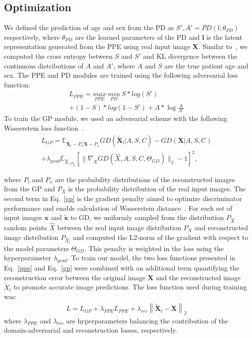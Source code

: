 \documentclass[conference]{IEEEtran}
\begin{document}
\subsection{Optimization}
We defined the prediction of age and sex from the PD as $S',A'=PD(l;\theta_{PD})$ respectively, where $\theta_{PD}$ are the learned parameters of the PD and \textbf{l} is the latent representation generated from the PPE using real input image \textbf{X}. Similar to~\cite{Wang2021Deep}, we computed the cross entropy between $S$ and $S'$ and KL divergence between the continuous distributions of $A$ and $A'$, where $A$ and $S$ are the true patient age and sex. The PPE and PD modules are trained using the following adversarial loss function:
\vspace{-2mm}
\begin{multline}\label{ppe}
    L_{PPE}=\underset{PPE}{max}\ \underset{PD}{min}\ S*log(S')\\+(1-S)*log(1-S')+A *\log\frac{A}{A'}
\end{multline}
To train the GP module, we used an adversarial scheme with the following Wasserstein loss function~\cite{Gulrajani2017Improved}.
\vspace{-2mm}
\begin{multline}\label{gp}
    L_{GP} = \mathbb{E} _{\tilde{\textbf{X}}_l \sim P_l | \textbf{X} \sim P_x} GD(\tilde{\textbf{X}}_l|A,S,C)-GD(\textbf{X}|A,S,C)\\ +\lambda _{grad} \mathbb{E} _{\hat{X}_{\sim P_{\hat{X}}}}[\| \nabla_{\hat{X}} GD(\hat{X},A,S,C,\Theta_{GD})\|_2 -1]^2, 
\end{multline}

where $P_l$ and $P_x$ are the probability distributions of the reconstructed images from the GP and $P_X$ is the probability distribution of the real input images. The second term in Eq.~\ref{gp} is the gradient penalty aimed to optimize discriminator performance and enable calculation of Wasserstein distance~\cite{Gulrajani2017Improved}. For each set of input images $\textbf{x}$ and $\tilde{\textbf{x}}$ to GD, we uniformly sampled from the distribution $P_{\hat{X}}$ random points $\hat{X}$ between the real input image distribution $P_X$ and reconstructed image distribution $P_{\hat{X}_l}$ and computed the L2-norm of the gradient with respect to the model parameters $\Theta_{GD}$. This penalty is weighted in the loss using the hyperparameter $\lambda _{grad}$.
To train our model, the two loss functions presented in Eq.~\ref{ppe} and Eq.~\ref{gp} were combined with an additional term quantifying the reconstruction error between the original image $\textbf{X}$ and the reconstructed image $\tilde{X}_l$ to promote accurate image predictions. The loss function used during training was:
\begin{multline}\label{loss}
    L = L_{GP} + \lambda_{PPE}L_{PPE}+\lambda_{rec}\left\lVert \tilde{\textbf{X}}_l-\textbf{X}\right\rVert_2
\end{multline}
\vspace*{-1mm}
where $\lambda_{PPE}$ and $\lambda_{rec}$ are hyperparameters balancing the contribution of the domain-adversarial and reconstruction losses, respectively. 
\end{document}
